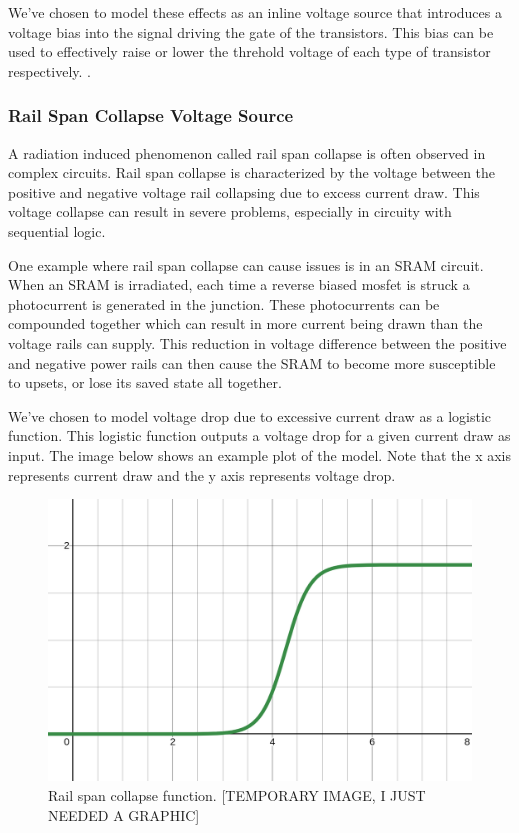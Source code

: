 \documentclass[conference]{IEEEtran}
\begin{document}
We've chosen to model these effects as an inline voltage source that introduces a voltage bias into the signal driving the gate of the transistors. This bias can be used to effectively raise or lower the threhold voltage of each type of transistor respectively.
\cite{Pepper1990}.

\vspace{1em}
\subsubsection{Rail Span Collapse Voltage Source}
A radiation induced phenomenon called rail span collapse is often observed in complex circuits. Rail span collapse is characterized by the voltage between the positive and negative voltage rail collapsing due to excess current draw. This voltage collapse can result in severe problems, especially in circuity with sequential logic.

One example where rail span collapse can cause issues is in an SRAM circuit. When an SRAM is irradiated, each time a reverse biased mosfet is struck a photocurrent is generated in the junction. These photocurrents can be compounded together which can result in more current being drawn than the voltage rails can supply. This reduction in voltage difference between the positive and negative power rails can then cause the SRAM to become more susceptible to upsets, or lose its saved state all together. 

We've chosen to model voltage drop due to excessive current draw as a logistic function. This logistic function outputs a voltage drop for a given current draw as input. The image below shows an example plot of the model. Note that the x axis represents current draw and the y axis represents voltage drop.

\begin{figure}[H]
\centering
\includegraphics[width=0.9\linewidth]{rail_collapse_function.png}
\caption{Rail span collapse function. [TEMPORARY IMAGE, I JUST NEEDED A GRAPHIC]}
\label{fig:rail_collapse_function}
\end{figure}
\end{document}
